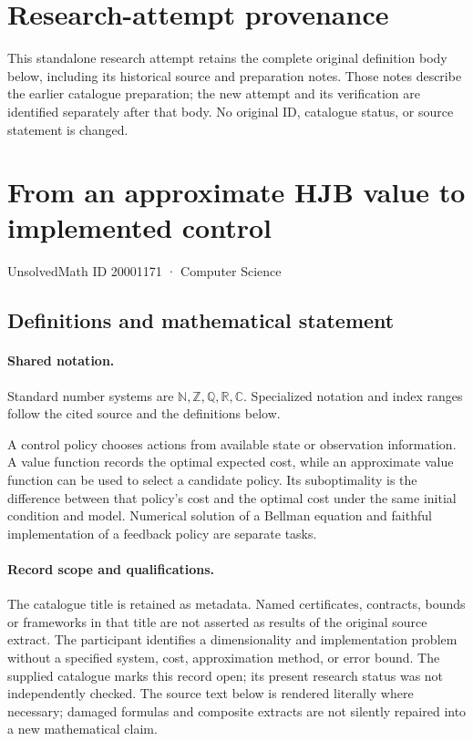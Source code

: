 \documentclass[11pt]{article}
\begin{document}
\section*{Research-attempt provenance}
This standalone research attempt retains the complete original definition body below,
including its historical source and preparation notes. Those notes describe the
earlier catalogue preparation; the new attempt and its verification are identified
separately after that body. No original ID, catalogue status, or source statement is changed.

\section{From an approximate HJB value to implemented control}\label{20001171}
{\small UnsolvedMath ID 20001171 · Computer Science}
\subsection{Definitions and mathematical statement}

\paragraph{Shared notation.}Standard number systems are $\mathbb N,\mathbb Z,\mathbb Q,\mathbb R,\mathbb C$. Specialized notation and index ranges follow the cited source and the definitions below.


A control policy chooses actions from available state or observation information. A value function records the optimal expected cost, while an approximate value function can be used to select a candidate policy. Its suboptimality is the difference between that policy's cost and the optimal cost under the same initial condition and model. Numerical solution of a Bellman equation and faithful implementation of a feedback policy are separate tasks.
\paragraph{Record scope and qualifications.}
The catalogue title is retained as metadata. Named certificates, contracts, bounds or frameworks in that title are not asserted as results of the original source extract.
The participant identifies a dimensionality and implementation problem without a specified system, cost, approximation method, or error bound. The supplied catalogue marks this record open; its present research status was not independently checked.
The source text below is rendered literally where necessary; damaged formulas and composite extracts are not silently repaired into a new mathematical claim.
\end{document}
